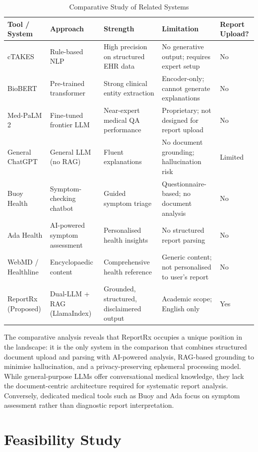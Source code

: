 \begin{table}[h]
\centering
\caption{Comparative Study of Related Systems}
\begin{tabular}{|p{1.9cm}|p{1.9cm}|p{2.2cm}|p{2.4cm}|p{1.6cm}|}
    \hline
    \textbf{Tool / System} & \textbf{Approach} & \textbf{Strength} & \textbf{Limitation} & \textbf{Report Upload?} \\
    \hline
    cTAKES & Rule-based NLP & High precision on structured EHR data & No generative output; requires expert setup & No \\
    BioBERT & Pre-trained transformer & Strong clinical entity extraction & Encoder-only; cannot generate explanations & No \\
    Med-PaLM 2 & Fine-tuned frontier LLM & Near-expert medical QA performance & Proprietary; not designed for report upload & No \\
    General ChatGPT & General LLM (no RAG) & Fluent explanations & No document grounding; hallucination risk & Limited \\
    Buoy Health & Symptom-checking chatbot & Guided symptom triage & Questionnaire-based; no document analysis & No \\
    Ada Health & AI-powered symptom assessment & Personalised health insights & No structured report parsing & No \\
    WebMD / Healthline & Encyclopaedic content & Comprehensive health reference & Generic content; not personalised to user's report & No \\
    ReportRx (Proposed) & Dual-LLM + RAG (LlamaIndex) & Grounded, structured, disclaimered output & Academic scope; English only & Yes \\
    \hline
\end{tabular}
\end{table}

The comparative analysis reveals that ReportRx occupies a unique position in the landscape: it is the only system in the comparison that combines structured document upload and parsing with AI-powered analysis, RAG-based grounding to minimise hallucination, and a privacy-preserving ephemeral processing model. While general-purpose LLMs offer conversational medical knowledge, they lack the document-centric architecture required for systematic report analysis. Conversely, dedicated medical tools such as Buoy and Ada focus on symptom assessment rather than diagnostic report interpretation.

\section{Feasibility Study}

